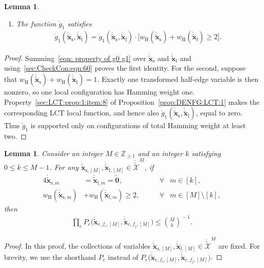 \documentclass[journal]{IEEEtran}
\newcommand{\add}[1]{{\color{black}#1}}
\newtheorem{lemma}[theorem]{Lemma}
\newcommand{\vect}[1]{ \bm{#1} }
\newcommand{\wh}{w_{\mathrm{H}}}
\newcommand{\sZpp}{ \mathbb{Z}_{\geq 1} }
\newcommand{\LCTtset}[1]{\mathring{\tilde{\mathcal{#1}}}}
\newcommand{\LCTtv}[1]{ \mathring{ \tilde{ \vect{#1} } } }
\newcommand{\LCT}[1]{ \mathring{#1} }
\newcommand{\efi}{ e,f_i }
\newcommand{\efj}{ e,f_j }
\newcommand{\LCTvxl}{ \LCTtv{x}_{\mathrm{l}} }
\newcommand{\LCTvxs}{ \LCTtv{x}_{\mathrm{s}} }
\newcommand{\LCTvxlm}{ \LCTtv{x}_{\mathrm{l},m} }
\newcommand{\LCTvxsm}{ \LCTtv{x}_{\mathrm{s},m} }
\newcommand{\LCTvxlM}{ \LCTtv{x}_{\mathrm{l},[M]} }
\newcommand{\LCTvxsM}{ \LCTtv{x}_{\mathrm{s},[M]} }
\newcommand{\gone}{\LCT{g}_{1}}
\newcommand{\tv}[1]{ \tilde{\vect{#1}} }
\begin{document}
\begin{appendices}
\begin{lemma}
\begin{enumerate}
      \item \add{The function $\gone$ satisfies}
            \begin{align*}
              \gone( \LCTvxs, \LCTvxl ) = \gone( \LCTvxs, \LCTvxl) \cdot
              \bigl[ \wh(\LCTvxs) \! + \! \wh( \LCTvxl) \! \geq \! 2 \bigr].
            \end{align*}

    \end{enumerate}

  \end{lemma}
  \begin{proof}
    \add{Summing~\eqref{eqn: property of g0 g1} over $\LCTvxs$ and $\LCTvxl$
      and using~\eqref{sec:CheckCon:eqn:60} proves the first identity. For the
      second, suppose that $\wh(\LCTvxs)+\wh(\LCTvxl)=1$. Exactly one
      transformed half-edge variable is then nonzero, so one local
      configuration has Hamming weight
      one. Property~\ref{sec:LCT:prop:1:item:8} of
      Proposition~\ref{prop:DENFG:LCT:1} makes the corresponding LCT local
      function, and hence also $\gone(\LCTvxs,\LCTvxl)$, equal to zero. Thus
      $\gone$ is supported only on configurations of total Hamming weight at
      least two.}
  \end{proof}

  \begin{lemma} \label{sec:CheckCon:lem: lower bound of Pe}
    Consider an integer $ M \in \sZpp $ and an integer $ k $ satisfying $ 0 \leq k \leq M-1 $.
    For any $ \LCTvxsM,\LCTvxlM \in \LCTtset{X}^{M} $, if
    \begin{alignat}{4}
      \LCTvxsm      & = \LCTvxlm = \tv{0},\qquad     & \forall & m \in [k], \label{eqn: assum on k} \\
      \wh(\LCTvxsm) & + \wh( \LCTvxlm) \geq 2,\qquad & \forall & m \in [M] \setminus [k],
      \label{eqn: assum on M - k}
    \end{alignat}
    then
    \begin{align*}
      \prod_{e}
      P_{e}\bigl( \LCTtv{x}_{\efi,[M]}, \LCTtv{x}_{\efj,[M]} \bigr)
      \leq \binom{M}{k}^{\!\! -1}.
    \end{align*}
  \end{lemma}

  \begin{proof}
    In this proof, the collections of variables $ \LCTvxsM,\LCTvxlM \in \LCTtset{X}^{M} $ are fixed.
    \add{For brevity, we use the shorthand $ P_{e} $ instead of}
    $ P_{e}\bigl( \LCTtv{x}_{\efi,[M]}, \LCTtv{x}_{\efj,[M]} \bigr)$.


\end{proof}
\end{appendices}
\end{document}
